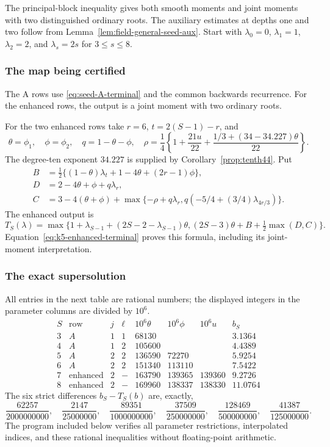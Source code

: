 \documentclass[11pt]{amsart}
\theoremstyle{definition}
\numberwithin{equation}{section}
\begin{document}
The principal-block inequality gives both smooth moments and joint
moments with two distinguished ordinary roots. The auxiliary estimates
at depths one and two follow from Lemma~\ref{lem:field-general-seed-aux}.
Start with $\lambda_0=0$, $\lambda_1=1$, $\lambda_2=2$, and
$\lambda_s=2s$ for $3\le s\le8$.

\subsubsection{The map being certified}
The A rows use \eqref{eq:seed-A-terminal} and the common
backwards recurrence. For the enhanced rows, the output is a joint
moment with two ordinary roots.

For the two enhanced rows take $r=6$, $t=2(S-1)-r$, and
\[
 \theta=\phi_1,\quad\phi=\phi_2,\quad q=1-\theta-\phi,
 \quad
 \rho=\frac14\left\{1+\frac{21u}{22}
                  +\frac{1/3+(34-34.227)\theta}{22}\right\}.
\]
The degree-ten exponent $34.227$ is supplied by Corollary~\ref{prop:tenth44}.
Put
\begin{align*}
 B&=\tfrac12\{(1-\theta)\lambda_t+1-4\theta+(2r-1)\phi\},\\
 D&=2-4\theta+\phi+q\lambda_r,\\
 C&=3-4(\theta+\phi)
        +\max\{-\rho+q\lambda_r,
                 q(-5/4+(3/4)\lambda_{4r/3})\}.
\end{align*}
The enhanced output is
\[
 T_S(\lambda)=\max\{1+\lambda_{S-1}
             +(2S-2-\lambda_{S-1})\theta,
                         (2S-3)\theta+B+\tfrac12\max(D,C)\}.
\]
Equation~\eqref{eq:k5-enhanced-terminal} proves this formula, including its
joint-moment interpretation.

\subsubsection{The exact supersolution}
All entries in the next table are rational numbers; the displayed integers
in the parameter columns are divided by $10^6$.
\[
\begin{array}{c|c|c|c|r|r|r|c}
 S&\text{row}&j&\ell&10^6\theta&10^6\phi&10^6u&b_S\\\hline
3&A&1&1&68130&&&3.1364\\
4&A&1&2&105600&&&4.4389\\
5&A&2&2&136590&72270&&5.9254\\
6&A&2&2&151340&113110&&7.5422\\
7&\text{enhanced}&2&-&163790&139365&139360&9.2726\\
8&\text{enhanced}&2&-&169960&138337&138330&11.0764
\end{array}
\]
The six strict differences $b_S-T_S(b)$ are, exactly,
\[
 \frac{62257}{2000000000},\quad
 \frac{2147}{25000000},\quad
 \frac{89351}{1000000000},\quad
 \frac{37509}{250000000},\quad
 \frac{128469}{500000000},\quad
 \frac{41387}{125000000}.
\]
The program included below verifies all parameter restrictions, interpolated
indices, and these rational inequalities without floating-point arithmetic.
\end{document}
